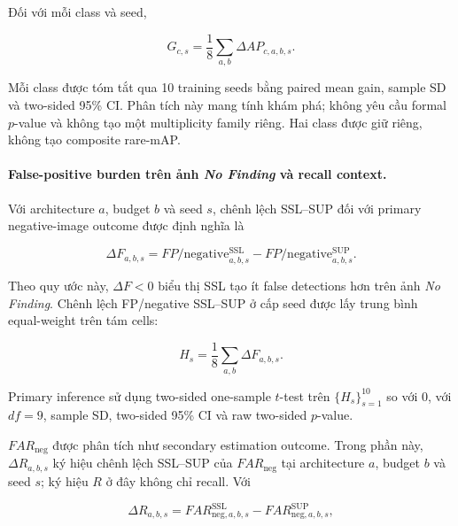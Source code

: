 \documentclass[pdflatex,sn-mathphys-num]{sn-jnl}%
\theoremstyle{thmstyleone}%
\theoremstyle{thmstyletwo}%
\theoremstyle{thmstylethree}%
\begin{document}
Đối với mỗi class và seed,

\begin{equation}
G_{c,s}
=
\frac{1}{8}
\sum_{a,b}
\Delta AP_{c,a,b,s}.
\label{eq:rare_class_seed_gain}
\end{equation}

Mỗi class được tóm tắt qua 10 training seeds bằng paired mean gain, sample
SD và two-sided 95\% CI. Phân tích này mang tính khám phá; không yêu cầu
formal \(p\)-value và không tạo một multiplicity family riêng. Hai class
được giữ riêng, không tạo composite rare-mAP.

\paragraph{False-positive burden trên ảnh \textit{No Finding} và recall context.}

Với architecture \(a\), budget \(b\) và seed \(s\), chênh lệch SSL--SUP đối
với primary negative-image outcome được định nghĩa là

\begin{equation}
\Delta F_{a,b,s}
=
FP/\mathrm{negative}^{\mathrm{SSL}}_{a,b,s}
-
FP/\mathrm{negative}^{\mathrm{SUP}}_{a,b,s}.
\label{eq:rq6_cell_effect}
\end{equation}

Theo quy ước này, \(\Delta F<0\) biểu thị SSL tạo ít false detections hơn
trên ảnh \textit{No Finding}. Chênh lệch FP/negative SSL--SUP ở cấp seed được lấy trung bình
equal-weight trên tám cells:

\begin{equation}
H_s
=
\frac{1}{8}
\sum_{a,b}
\Delta F_{a,b,s}.
\label{eq:rq6_seed_effect}
\end{equation}

Primary inference sử dụng two-sided one-sample \(t\)-test trên
\(\{H_s\}_{s=1}^{10}\) so với \(0\), với \(df=9\), sample SD,
two-sided 95\% CI và raw two-sided \(p\)-value.

\(FAR_{\mathrm{neg}}\) được phân tích như secondary estimation outcome.
Trong phần này, \(\Delta R_{a,b,s}\) ký hiệu chênh lệch SSL--SUP của
\(FAR_{\mathrm{neg}}\) tại architecture \(a\), budget \(b\) và seed \(s\);
ký hiệu \(R\) ở đây không chỉ recall. Với

\begin{equation}
\Delta R_{a,b,s}
=
FAR^{\mathrm{SSL}}_{\mathrm{neg},a,b,s}
-
FAR^{\mathrm{SUP}}_{\mathrm{neg},a,b,s},
\label{eq:far_cell_effect}
\end{equation}
\end{document}
